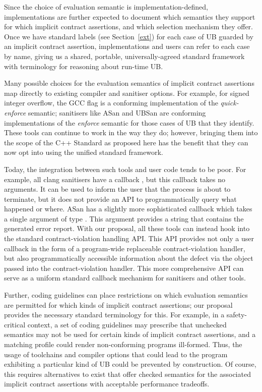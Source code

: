 Since the choice of evaluation semantic is  implementation-defined, implementations are further expected to document which semantics they support for which implicit contract assertions, and which selection mechanism they offer. Once we have standard labels (see Section~\ref{ext}) for each case of UB guarded by an implicit contract assertion, implementations and users can refer to each case by name, giving us a shared, portable, universally-agreed standard framework with terminology for reasoning about run-time UB.

Many possible choices for the evaluation semantics of implicit contract assertions map directly to existing compiler and sanitiser options. For example, for signed integer overflow, the GCC flag  is a conforming implementation of the \emph{quick-enforce} semantic; sanitisers like ASan and UBSan are conforming implementations of the \emph{enforce} semantic for those cases of UB that they identify. These tools can continue to work in the way they do; however, bringing them into the scope of the C++ Standard as proposed here has the benefit that they can now opt into using the unified standard framework.

Today, the integration between such tools and user code tends to be poor. For example, all clang sanitisers have a callback , but this callback takes no arguments. It can be used to inform the user that the process is about to terminate, but it does not provide an API to programmatically query what happened or where. ASan has a slightly more sophisticated callback  which takes a single argument of type . This argument provides a string that contains the generated error report. With our proposal, all these tools can instead hook into the standard contract-violation handling API. This API provides not only a user callback in the form of a  program-wide replaceable contract-violation handler, but also programmatically accessible information about the defect via the  \mbox{} object passed into the contract-violation handler. This more comprehensive API can serve as a uniform standard callback mechanism for sanitisers and other tools.

Further, coding guidelines can place restrictions on which evaluation semantics are permitted for which kinds of implicit contract assertions; our proposal provides the necessary standard terminology for this. For example, in a safety-critical context, a set of coding guidelines may prescribe that unchecked semantics may not be used for certain kinds of implicit contract assertions, and a matching profile could render non-conforming programs ill-formed. Thus, the usage of toolchains and compiler options that could lead to the program exhibiting a particular kind of UB could be prevented by construction. Of course, this requires alternatives to exist that offer checked semantics for the associated implicit contract assertions with acceptable performance tradeoffs.


